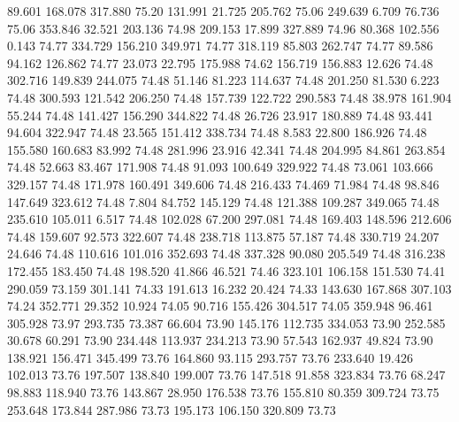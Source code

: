   89.601  168.078  317.880        75.20
 131.991   21.725  205.762        75.06
 249.639    6.709   76.736        75.06
 353.846   32.521  203.136        74.98
 209.153   17.899  327.889        74.96
  80.368  102.556    0.143        74.77
 334.729  156.210  349.971        74.77
 318.119   85.803  262.747        74.77
  89.586   94.162  126.862        74.77
  23.073   22.795  175.988        74.62
 156.719  156.883   12.626        74.48
 302.716  149.839  244.075        74.48
  51.146   81.223  114.637        74.48
 201.250   81.530    6.223        74.48
 300.593  121.542  206.250        74.48
 157.739  122.722  290.583        74.48
  38.978  161.904   55.244        74.48
 141.427  156.290  344.822        74.48
  26.726   23.917  180.889        74.48
  93.441   94.604  322.947        74.48
  23.565  151.412  338.734        74.48
   8.583   22.800  186.926        74.48
 155.580  160.683   83.992        74.48
 281.996   23.916   42.341        74.48
 204.995   84.861  263.854        74.48
  52.663   83.467  171.908        74.48
  91.093  100.649  329.922        74.48
  73.061  103.666  329.157        74.48
 171.978  160.491  349.606        74.48
 216.433   74.469   71.984        74.48
  98.846  147.649  323.612        74.48
   7.804   84.752  145.129        74.48
 121.388  109.287  349.065        74.48
 235.610  105.011    6.517        74.48
 102.028   67.200  297.081        74.48
 169.403  148.596  212.606        74.48
 159.607   92.573  322.607        74.48
 238.718  113.875   57.187        74.48
 330.719   24.207   24.646        74.48
 110.616  101.016  352.693        74.48
 337.328   90.080  205.549        74.48
 316.238  172.455  183.450        74.48
 198.520   41.866   46.521        74.46
 323.101  106.158  151.530        74.41
 290.059   73.159  301.141        74.33
 191.613   16.232   20.424        74.33
 143.630  167.868  307.103        74.24
 352.771   29.352   10.924        74.05
  90.716  155.426  304.517        74.05
 359.948   96.461  305.928        73.97
 293.735   73.387   66.604        73.90
 145.176  112.735  334.053        73.90
 252.585   30.678   60.291        73.90
 234.448  113.937  234.213        73.90
  57.543  162.937   49.824        73.90
 138.921  156.471  345.499        73.76
 164.860   93.115  293.757        73.76
 233.640   19.426  102.013        73.76
 197.507  138.840  199.007        73.76
 147.518   91.858  323.834        73.76
  68.247   98.883  118.940        73.76
 143.867   28.950  176.538        73.76
 155.810   80.359  309.724        73.75
 253.648  173.844  287.986        73.73
 195.173  106.150  320.809        73.73
